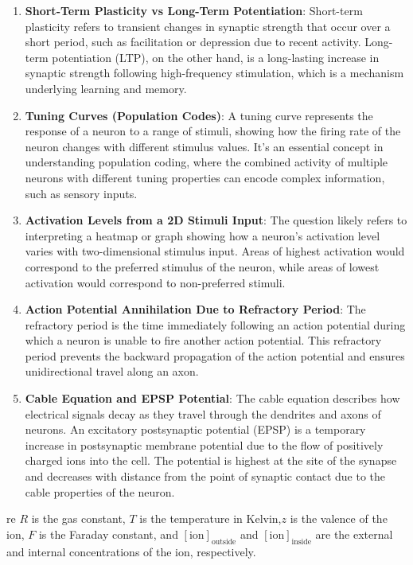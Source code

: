 \documentclass{article}
\begin{document}
\begin{enumerate}
    \item \textbf{Short-Term Plasticity vs Long-Term Potentiation}: Short-term plasticity refers to transient changes in synaptic strength that occur over a short period, such as facilitation or depression due to recent activity. Long-term potentiation (LTP), on the other hand, is a long-lasting increase in synaptic strength following high-frequency stimulation, which is a mechanism underlying learning and memory.

    \item \textbf{Tuning Curves (Population Codes)}: A tuning curve represents the response of a neuron to a range of stimuli, showing how the firing rate of the neuron changes with different stimulus values. It's an essential concept in understanding population coding, where the combined activity of multiple neurons with different tuning properties can encode complex information, such as sensory inputs.

    \item \textbf{Activation Levels from a 2D Stimuli Input}: The question likely refers to interpreting a heatmap or graph showing how a neuron's activation level varies with two-dimensional stimulus input. Areas of highest activation would correspond to the preferred stimulus of the neuron, while areas of lowest activation would correspond to non-preferred stimuli.

    \item \textbf{Action Potential Annihilation Due to Refractory Period}: The refractory period is the time immediately following an action potential during which a neuron is unable to fire another action potential. This refractory period prevents the backward propagation of the action potential and ensures unidirectional travel along an axon.

    \item \textbf{Cable Equation and EPSP Potential}: The cable equation describes how electrical signals decay as they travel through the dendrites and axons of neurons. An excitatory postsynaptic potential (EPSP) is a temporary increase in postsynaptic membrane potential due to the flow of positively charged ions into the cell. The potential is highest at the site of the synapse and decreases with distance from the point of synaptic contact due to the cable properties of the neuron.
\end{enumerate}

re $R$ is the gas constant, $T$ is the temperature in Kelvin,$z$ is the valence of the ion, $F$ is the Faraday constant, and $[\text{ion}]_{\text{outside}}$ and $[\text{ion}]_{\text{inside}}$ are the external and internal concentrations of the ion, respectively.
\end{document}
